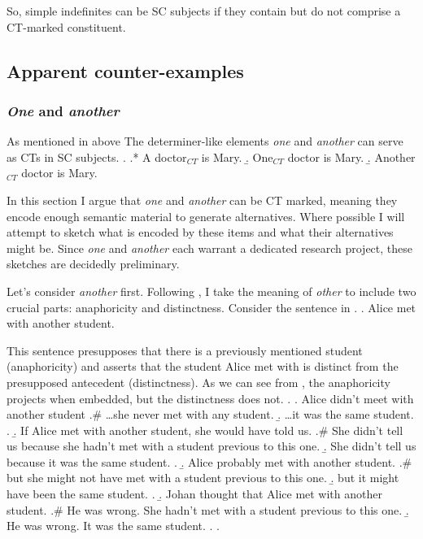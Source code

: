 \documentclass[GPFinal]{subfiles}
\begin{document}
So, simple indefinites can be SC subjects if they contain but do not comprise a CT-marked constituent.
\subsection{Apparent counter-examples}
\subsubsection{\textit{One} and \textit{another}}
As mentioned in above The determiner-like elements \textit{one} and \textit{another} can serve as CTs in SC subjects.
\ex.\label{ex:AONeAnother}
\a.* A doctor$_{CT}$ is Mary.
\b.\label{ex:OneCT} One$_{CT}$ doctor is Mary.
\b.\label{ex:AnotherCT} Another$_{CT}$ doctor is Mary.

In this section I argue that \textit{one} and \textit{another} can be CT marked, meaning they encode enough semantic material to generate alternatives.
Where possible I will attempt to sketch what is encoded by these items and what their alternatives might be.
Since \textit{one} and \textit{another} each warrant a dedicated research project, these sketches are decidedly preliminary.

Let's consider \textit{another} first.
Following \textcite{heim1991reciprocity}, I take the meaning of  \textit{other} to include two crucial parts: anaphoricity and distinctness.
Consider the sentence in \Next.
\ex. Alice met with another student.

This sentence presupposes that there is a previously mentioned student (anaphoricity) and asserts that the student Alice met with is distinct from the presupposed antecedent (distinctness). 
As we can see from \Next, the anaphoricity projects when embedded, but the distinctness does not.
\ex.
\a. Alice didn't meet with another student
\a.\# \dots she never met with any student.
\b. \dots it was the same student.
\z.
\b. If Alice met with another student, she would have told us.
\a.\# She didn't tell us because she hadn't met with a student previous to this one.
\b. She didn't tell us because it was the same student.
\z.
\b. Alice probably met with another student.
\a.\# but she might not have met with a student previous to this one.
\b. but it might have been the same student. 
\z.
\b. Johan thought that Alice met with another student.
\a.\# He was wrong. She hadn't met with a student previous to this one.
\b. He was wrong. It was the same student.
\z.
\z.
\end{document}
